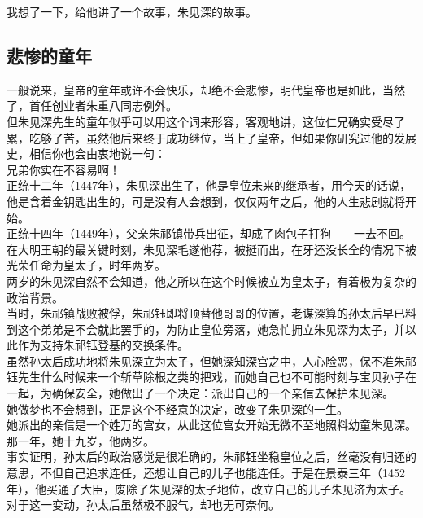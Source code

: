 \begin{multicols}{\theparacolNo}
我想了一下，给他讲了一个故事，朱见深的故事。\\

\subsection{悲惨的童年}
一般说来，皇帝的童年或许不会快乐，却绝不会悲惨，明代皇帝也是如此，当然了，首任创业者朱重八同志例外。\\

但朱见深先生的童年似乎可以用这个词来形容，客观地讲，这位仁兄确实受尽了累，吃够了苦，虽然他后来终于成功继位，当上了皇帝，但如果你研究过他的发展史，相信你也会由衷地说一句：\\

兄弟你实在不容易啊！\\

正统十二年（1447年），朱见深出生了，他是皇位未来的继承者，用今天的话说，他是含着金钥匙出生的，可是没有人会想到，仅仅两年之后，他的人生悲剧就将开始。\\

正统十四年（1449年），父亲朱祁镇带兵出征，却成了肉包子打狗——一去不回。在大明王朝的最关键时刻，朱见深毛遂他荐，被挺而出，在牙还没长全的情况下被光荣任命为皇太子，时年两岁。\\

两岁的朱见深自然不会知道，他之所以在这个时候被立为皇太子，有着极为复杂的政治背景。\\

当时，朱祁镇战败被俘，朱祁钰即将顶替他哥哥的位置，老谋深算的孙太后早已料到这个弟弟是不会就此罢手的，为防止皇位旁落，她急忙拥立朱见深为太子，并以此作为支持朱祁钰登基的交换条件。\\

虽然孙太后成功地将朱见深立为太子，但她深知深宫之中，人心险恶，保不准朱祁钰先生什么时候来一个斩草除根之类的把戏，而她自己也不可能时刻与宝贝孙子在一起，为确保安全，她做出了一个决定：派出自己的一个亲信去保护朱见深。\\

她做梦也不会想到，正是这个不经意的决定，改变了朱见深的一生。\\

她派出的亲信是一个姓万的宫女，从此这位宫女开始无微不至地照料幼童朱见深。\\

那一年，她十九岁，他两岁。\\

事实证明，孙太后的政治感觉是很准确的，朱祁钰坐稳皇位之后，丝毫没有归还的意思，不但自己追求连任，还想让自己的儿子也能连任。于是在景泰三年（1452年），他买通了大臣，废除了朱见深的太子地位，改立自己的儿子朱见济为太子。对于这一变动，孙太后虽然极不服气，却也无可奈何。\\


\end{multicols}

